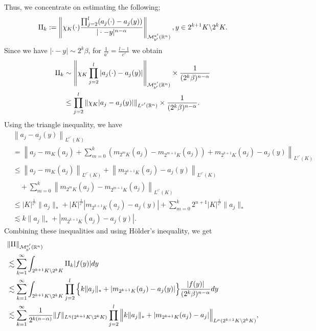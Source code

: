 \documentclass[11pt,a4]{article}
\numberwithin{equation}{section}
\theoremstyle{definition}
\theoremstyle{remark}
\begin{document}
Thus, we concentrate on estimating the following;   
\[
	{\rm II}_k:=\left\| \chi_K(\cdot) \frac{ \prod_{j=2}^{l}(a_j(\cdot)-a_j(y))}{|\cdot - y|^{n-\alpha}}\right\|_{{\mathcal M}^{a'}_{b'}({\mathbb R}^n)}, y \in 2^{k+1}K \backslash 2^kK.
\]
Since we have $|\cdot - y| \sim 2^k\beta$, for $\frac{1}{a'}=\frac{l-1}{c'}$ we obtain
\begin{align*}
	{\rm II}_k&\sim \left\| \chi_K \prod_{j=2}^{l}|a_j(\cdot)-a_j(y)| \right\|_{{\mathcal M}^{a'}_{b'}({\mathbb R}^n)}\times \frac{1}{(2^k\beta)^{n-\alpha}}\\
	&\le \prod_{j=2}^{l} \left\| \chi_K |a_j-a_j(y)| \right\|_{L^{c'}({\mathbb R}^n)} \times \frac{1}{(2^k\beta)^{n-\alpha}}.
\end{align*}
Using the triangle inequality, we have 
\begin{align*}
	&\left\| a_j-a_j(y) \right\|_{L^{c'}(K)}\\
	&=\left\| a_j - m_K(a_j) + \sum_{m=0}^{k}(m_{2^mK}(a_j)-m_{2^{m+1}K}(a_j)) + m_{2^{k+1}K}(a_j)-a_j(y) \right\|_{L^{c'}(K)}\\
	&\le \left\|a_j-m_K(a_j)\right\|_{L^{c'}(K)} + \left\|m_{2^{k+1}K}(a_j)-a_j(y)\right\|_{L^{c'}(K)}\\
		&\quad + \sum_{m=0}^{k} \left\|m_{2^mK}(a_j)-m_{2^{m+1}K}(a_j) \right\|_{L^{c'}(K)}\\
	&\le |K|^{\frac{1}{c'}} \|a_j\|_* + |K|^{\frac{1}{c'}} |m_{2^{k+1}K}(a_j)-a_j(y)| + \sum_{m=0}^{k} 2^{n+1} |K|^{\frac{1}{c'}} \|a_j\|_*\\
	&\lesssim k\|a_j\|_* + |m_{2^{k+1}K}(a_j)-a_j(y)|.
\end{align*}
Combining these inequalities and using H\"{o}lder's inequality, we get
\begin{align*}
	&\|{\rm II}\|_{{\mathcal M}^{a'}_{b'}({\mathbb R}^n)}\\
	&\lesssim \sum_{k=1}^{\infty} \int_{2^{k+1}K \backslash 2^kK} {\rm II}_k |f(y)|dy\\
	&\lesssim \sum_{k=1}^{\infty} \int_{2^{k+1}K \backslash 2^kK} \prod_{j=2}^{l} \Big\{ k\|a_j\|_* + |m_{2^{k+1}K}(a_j)-a_j(y)| \Big\} \frac{|f(y)|}{(2^k\beta)^{n-\alpha}}dy\\
	&\lesssim \sum_{k=1}^{\infty} \frac{1}{2^{k(n-\alpha)}} \|f\|_{L^{\eta}(2^{k+1}K \backslash 2^kK)} \prod_{j=2}^{l} \Big\| k\|a_j\|_* + |m_{2^{k+1}K}(a_j)-a_j| \Big\|_{L^{\mu}(2^{k+1}K \backslash 2^kK)},
\end{align*}
\end{document}
